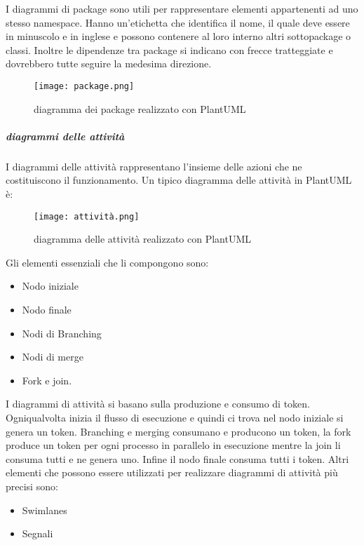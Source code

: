 \documentclass[../../norme-di-progetto.tex]{subfiles}
\begin{document}
I diagrammi di package sono utili per rappresentare elementi appartenenti ad uno stesso namespace. Hanno un'etichetta che identifica il nome, il quale deve essere in minuscolo e in inglese e possono contenere al loro interno altri sottopackage o classi. Inoltre le dipendenze tra package si indicano con frecce tratteggiate e dovrebbero tutte seguire la medesima direzione.
 \begin{figure}[H]%
    \label{fig:package}
    \texttt{[image: package.png]}
    \centering
    \caption{diagramma dei package realizzato con PlantUML}
  \end{figure}
 \subparagraph{diagrammi delle attività}%
 \label{diagrammi_delle_attivita}%
 I diagrammi delle attività rappresentano l'insieme delle azioni che ne costituiscono il funzionamento. Un tipico diagramma delle attività in PlantUML è:
  \begin{figure}[H]%
    \label{fig:attività}
    \texttt{[image: attività.png]}
    \centering
    \caption{diagramma delle attività realizzato con PlantUML}
  \end{figure}
  Gli elementi essenziali che li compongono sono:
  \begin{itemize}
    \item Nodo iniziale
    \item Nodo finale
    \item Nodi di Branching
    \item Nodi di merge
    \item Fork e join.
  \end{itemize}
  I diagrammi di attività si basano sulla produzione e consumo di token. Ogniqualvolta inizia il flusso di esecuzione e quindi ci trova nel nodo iniziale si genera un token. Branching e merging consumano e producono un token, la fork produce un token per ogni processo in parallelo in esecuzione mentre la join li consuma tutti e ne genera uno. Infine il nodo finale consuma tutti i token.
  Altri elementi che possono essere utilizzati per realizzare diagrammi di attività più precisi sono:
  \begin{itemize}
    \item Swimlanes
    \item Segnali
  \end{itemize}
\end{document}
